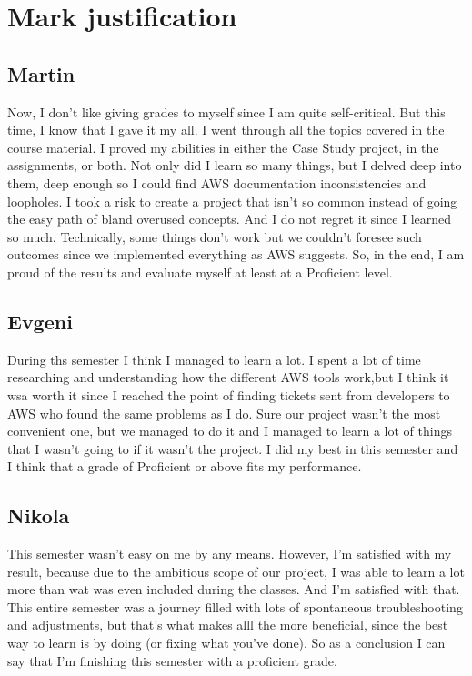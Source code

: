 \documentclass[10pt, a4paper]{article}
\begin{document}
\section{Mark justification}
\subsection{Martin}
Now, I don't like giving grades to myself since I am quite self-critical. But this time, I know that I gave it my all. I went through all the topics covered in the course material. I proved my abilities in either the Case Study project, in the assignments, or both. Not only did I learn so many things, but I delved deep into them, deep enough so I could find AWS documentation inconsistencies and loopholes. I took a risk to create a project that isn't so common instead of going the easy path of bland overused concepts. And I do not regret it since I learned so much. Technically, some things don't work but we couldn't foresee such outcomes since we implemented everything as AWS suggests. So, in the end, I am proud of the results and evaluate myself at least at a Proficient level.

\subsection{Evgeni}
During ths semester I think I managed to learn a lot. I spent a lot of time researching and understanding how the different AWS tools work,but I think it wsa worth it
since I reached the point of finding tickets sent from developers to AWS who found the same problems as I do. Sure our project wasn't the most convenient one, but we 
managed to do it and I managed to learn a lot of things that I wasn't going to if it wasn't the project. I did my best in this semester and I think that a grade of Proficient or above fits my performance. 

\subsection{Nikola}
This semester wasn't easy on me by any means. 
    However, I'm satisfied with my result, because due to the ambitious scope of our project, 
    I was able to learn a lot more than wat was even included during the classes. And I'm satisfied with that.
    This entire semester was a journey filled with lots of spontaneous troubleshooting and adjustments, but that's what makes alll the more beneficial, since the best way to learn is by doing (or fixing what you've done).
    So as a conclusion I can say that I'm finishing this semester with a proficient grade.
\end{document}
